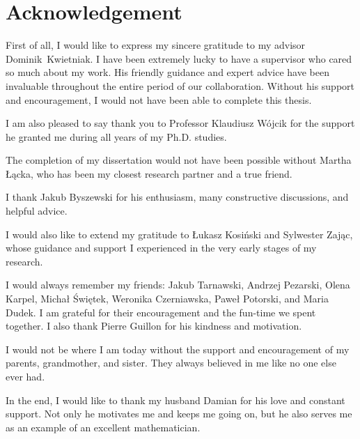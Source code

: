 \chapter*{Acknowledgement}


First of all, I would like to express my sincere gratitude to my advisor Dominik~Kwietniak. 
%
I have been extremely lucky to have a supervisor who cared so much about my work.
%
His friendly guidance and expert advice have been invaluable throughout  the entire period of our collaboration. 
%
Without his support and encouragement, I would not have been able to complete this thesis.


I am also pleased to say thank you to Professor Klaudiusz Wójcik for the support he granted me during all years of my Ph.D. studies.

The completion of my dissertation would not have been possible without Martha Łącka, who has been my closest research partner and a true friend. 

I thank Jakub Byszewski for his enthusiasm, many constructive discussions, and helpful advice.

I would also like to extend my gratitude to Łukasz Kosiński and Sylwester Zając, whose guidance and support I experienced in the very early stages of my research.

I would always remember my friends: Jakub Tarnawski, Andrzej Pezarski, Olena Karpel, Michał Świętek, Weronika Czerniawska, Paweł Potorski, and Maria Dudek. 
%
I am grateful for their encouragement and the fun-time we spent together. I also thank Pierre Guillon for his kindness and motivation.

I would not be where I am today without the support and encouragement of my parents, grandmother, and sister. They always believed in me like no one else ever had.

In the end, I would like to thank my husband Damian for his love and constant support. Not only he motivates me and keeps me going on, but he also serves me as an example of an excellent mathematician.